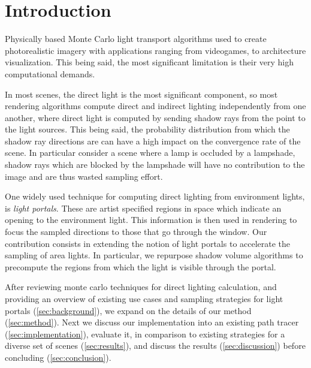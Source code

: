 \section{Introduction}
\label{sec:intro}

Physically based Monte Carlo light transport algorithms used to create photorealistic imagery with applications ranging from videogames, to architecture visualization. This being said, the most significant limitation is their very high computational demands. 

In most scenes, the direct light is the most significant component, so most rendering algorithms compute direct and indirect lighting independently from one another, where direct light is computed by sending shadow rays from the point to the light sources. This being said, the probability distribution from which the shadow ray directions are can have a high impact on the convergence rate of the scene. In particular consider a scene where a lamp is occluded by a lampshade, shadow rays which are blocked by the lampshade will have no contribution to the image and are thus wasted sampling effort.

One widely used technique for computing direct lighting from environment lights, is \emph{light portals}. These are artist specified regions in space which indicate an opening to the environment light. This information is then used in rendering to focus the sampled directions to those that go through the window. Our contribution consists in extending the notion of light portals to accelerate the sampling of area lights. In particular, we repurpose shadow volume algorithms to precompute the regions from which the light is visible through the portal.

After reviewing monte carlo techniques for direct lighting calculation, and providing an overview of existing use cases and sampling strategies for light portals (\autoref{sec:background}), we expand on the details of our method (\autoref{sec:method}). Next we discuss our implementation into an existing path tracer (\autoref{sec:implementation}), evaluate it, in comparison to existing strategies for a diverse set of scenes (\autoref{sec:results}), and discuss the results (\autoref{sec:discussion}) before concluding (\autoref{sec:conclusion}).
